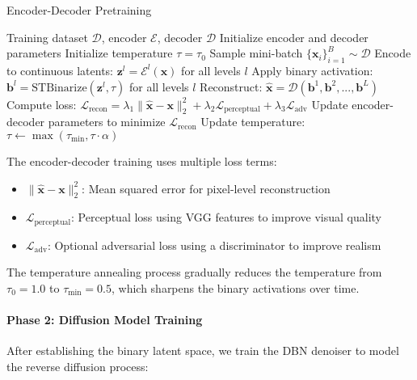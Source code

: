 \documentclass[10pt,twocolumn,letterpaper]{article}
\newcommand{\bm}[1]{\boldsymbol{#1}}
\newcommand{\latent}{\bm{z}}
\newcommand{\binary}{\bm{b}}
\newcommand{\encoder}{\mathcal{E}}
\newcommand{\decoder}{\mathcal{D}}
\newcommand{\img}{\bm{x}}
\newcommand{\recon}{\hat{\bm{x}}}
\begin{document}
\begin{algorithm}
\caption{Encoder-Decoder Pretraining}
\label{alg:encoder_decoder_training}
\begin{algorithmic}[1]
\REQUIRE Training dataset $\mathcal{D}$, encoder $\encoder$, decoder $\decoder$
\STATE Initialize encoder and decoder parameters
\STATE Initialize temperature $\tau = \tau_0$
\REPEAT
    \STATE Sample mini-batch $\{\img_i\}_{i=1}^B \sim \mathcal{D}$
    \STATE Encode to continuous latents: $\latent^l = \encoder^l(\img)$ for all levels $l$
    \STATE Apply binary activation: $\binary^l = \text{STBinarize}(\latent^l, \tau)$ for all levels $l$
    \STATE Reconstruct: $\recon = \decoder(\binary^1, \binary^2, ..., \binary^L)$
    \STATE Compute loss: $\mathcal{L}_{\text{recon}} = \lambda_1 \| \recon - \img \|_2^2 + \lambda_2 \mathcal{L}_{\text{perceptual}} + \lambda_3 \mathcal{L}_{\text{adv}}$
    \STATE Update encoder-decoder parameters to minimize $\mathcal{L}_{\text{recon}}$
    \STATE Update temperature: $\tau \gets \max(\tau_{\text{min}}, \tau \cdot \alpha)$
\end{algorithmic}
\end{algorithm}

The encoder-decoder training uses multiple loss terms:

\begin{itemize}
    \item $\| \recon - \img \|_2^2$: Mean squared error for pixel-level reconstruction
    \item $\mathcal{L}_{\text{perceptual}}$: Perceptual loss using VGG features to improve visual quality~\cite{johnson2016perceptual}
    \item $\mathcal{L}_{\text{adv}}$: Optional adversarial loss using a discriminator to improve realism~\cite{goodfellow2014generative}
\end{itemize}

The temperature annealing process gradually reduces the temperature from $\tau_0 = 1.0$ to $\tau_{\text{min}} = 0.5$, which sharpens the binary activations over time.

\paragraph{Phase 2: Diffusion Model Training}
After establishing the binary latent space, we train the DBN denoiser to model the reverse diffusion process:
\end{document}
